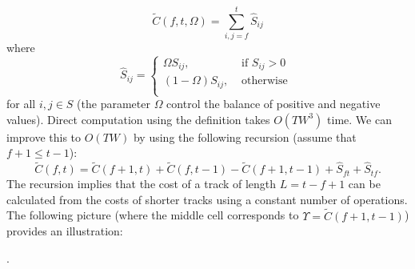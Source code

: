 \documentclass[twocolumn]{article}
\begin{document}
	\begin{dmath*}
		\tilde C(f,t, \Omega) =  \sum_{i,j=f}^{t} \hat S_{ij}
	\end{dmath*}
where
	\begin{dmath*}
		\hat S_{ij}=	{ \left\{
			\begin{array}{ll}
				\Omega S_{ij},  & \text{~if~}S_{ij} > 0   \\
				 \left( 1-\Omega \right) S_{ij}, & \mbox{~otherwise~}\\
			\end{array}
			\right.} 
	\end{dmath*} 
for all $i,j \in S$ (the parameter $\Omega$ control the balance of
positive and negative values). Direct computation using the definition
takes $O(TW^3)$ time. We can improve this to
$O(TW)$ by using the following recursion (assume that $f+1 \le t-1$):
	\begin{dmath*}
		\tilde C(f,t) = \tilde C(f+1,t) + \tilde C(f,t-1) - \tilde C(f+1,t-1) + \hat S_{ft} + \hat S_{tf}.
	\end{dmath*} 
The recursion implies that the cost of a track of length $L=t-f+1$ can
be calculated from the costs of shorter tracks using a constant number
of operations. The following picture (where the middle cell
corresponds to $\Upsilon = \tilde{C}(f+1,t-1)$) provides an
illustration:
	
	\begin{center}
		.
	\end{center} 
\end{document}
